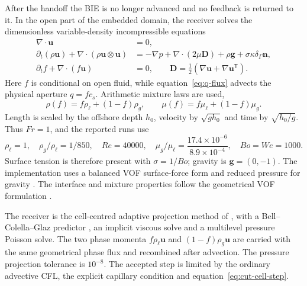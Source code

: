\documentclass[11pt]{article}
\begin{document}
After the handoff the BIE is no longer advanced and no feedback is returned to
it.  In the open part of the embedded domain, the receiver solves the
dimensionless variable-density incompressible equations
\begin{align}
 \nabla\!\cdot\boldsymbol u &=0,\label{eq:receiver-divergence}\\
 \partial_t(\rho\boldsymbol u)+
 \nabla\!\cdot(\rho\boldsymbol u\otimes\boldsymbol u)
 &= -\nabla p+\nabla\!\cdot(2\mu\boldsymbol D)
 +\rho\boldsymbol g+\sigma\kappa\delta_\Gamma\boldsymbol n,
 \label{eq:receiver-momentum}\\
 \partial_t f+\nabla\!\cdot(f\boldsymbol u)&=0,
 \qquad \boldsymbol D=\tfrac12
 (\nabla\boldsymbol u+\nabla\boldsymbol u^{\mathsf T}).
 \label{eq:receiver-phase}
\end{align}
Here $f$ is conditional on open fluid, while equation~\eqref{eq:q-flux}
advects the physical aperture $q=f c_s$.  Arithmetic mixture laws are used,
\begin{equation}
 \rho(f)=f\rho_\ell+(1-f)\rho_g,
 \qquad \mu(f)=f\mu_\ell+(1-f)\mu_g.
 \label{eq:mixture-laws}
\end{equation}
Length is scaled by the offshore depth $h_0$, velocity by
$\sqrt{g h_0}$ and time by $\sqrt{h_0/g}$.  Thus $Fr=1$, and the reported runs
use
\begin{equation}
 \rho_\ell=1,\quad \rho_g/\rho_\ell=1/850,\quad
 Re=40000,\quad \mu_g/\mu_\ell=
 \frac{17.4\times10^{-6}}{8.9\times10^{-4}},\quad
 Bo=We=1000.
 \label{eq:receiver-parameters}
\end{equation}
Surface tension is therefore present with $\sigma=1/Bo$; gravity is
$\boldsymbol g=(0,-1)$.  The implementation uses a balanced VOF surface-force
form and reduced pressure for gravity \cite{Popinet2009}.  The interface and
mixture properties follow the geometrical VOF formulation
\cite{HirtNichols1981,Popinet2009}.

The receiver is the cell-centred adaptive projection method of
\citet{Popinet2003}, with a Bell--Colella--Glaz predictor
\cite{BellColellaGlaz1989}, an implicit viscous solve and a multilevel pressure
Poisson solve.  The two phase momenta
$f\rho_\ell\boldsymbol u$ and $(1-f)\rho_g\boldsymbol u$ are carried with the
same geometrical phase flux and recombined after advection.  The pressure
projection tolerance is $10^{-8}$.  The accepted step is limited by the
ordinary advective CFL, the explicit capillary condition and
equation~\eqref{eq:cut-cell-step}.
\end{document}
